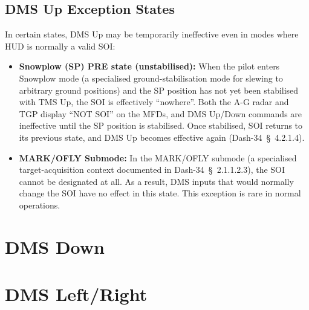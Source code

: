 \documentclass[11pt, a4paper, twoside]{report}
\providecommand{\dashref}[1]{Dash-34~\S~#1}
\begin{document}
\subsection{DMS Up Exception States}
\label{C4-S2-S3}

In certain states, DMS Up may be temporarily ineffective even in modes where HUD is normally a valid SOI:

\begin{itemize}
  \item \textbf{Snowplow (SP) PRE state (unstabilised):} When the pilot enters Snowplow mode (a specialised ground-stabilisation mode for slewing to arbitrary ground positions) and the SP position has not yet been stabilised with TMS Up, the SOI is effectively ``nowhere''. Both the A-G radar and TGP display ``NOT SOI'' on the MFDs, and DMS Up/Down commands are ineffective until the SP position is stabilised. Once stabilised, SOI returns to its previous state, and DMS Up becomes effective again (\dashref{4.2.1.4}).
  \item \textbf{MARK/OFLY Submode:} In the MARK/OFLY submode (a specialised target-acquisition context documented in \dashref{2.1.1.2.3}), the SOI cannot be designated at all. As a result, DMS inputs that would normally change the SOI have no effect in this state. This exception is rare in normal operations.
\end{itemize}

\section{DMS Down}
\label{sec:C4-S3}

\section{DMS Left/Right}
\label{sec:C4-S4}

\end{document}
